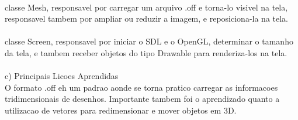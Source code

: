 \documentclass{article}
\begin{document}
\\
classe Mesh, responsavel por carregar um arquivo .off e torna-lo
visivel na tela, responsavel tambem por ampliar ou reduzir a imagem,
e reposiciona-la na tela.
\\
\\
classe Screen, responsavel por iniciar o SDL e o OpenGL, determinar
o tamanho da tela, e tambem receber objetos do tipo Drawable para
renderiza-los na tela.
\\
\\
c) Principais Licoes Aprendidas
\\
O formato .off eh um padrao aonde se torna pratico carregar as
informacoes tridimensionais de desenhos. Importante tambem foi o
aprendizado quanto a utilizacao de vetores para redimensionar e
mover objetos em 3D.
\end{document}
